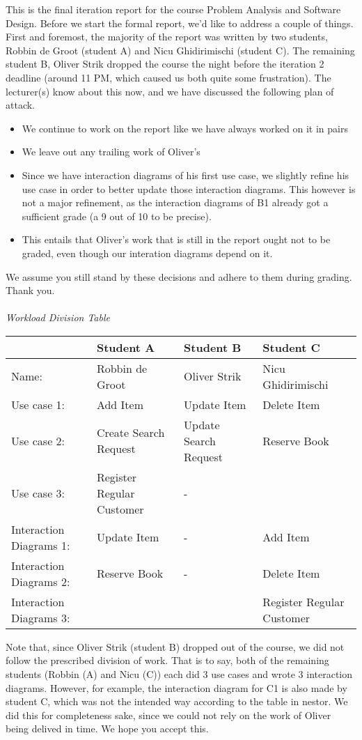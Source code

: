 This is the final iteration report for the course Problem Analysis and Software Design. Before we start the formal report, we'd like to address a couple of things.
First and foremost, the majority of the report was written by two students, Robbin de Groot (student A) and Nicu Ghidirimischi (student C). The remaining student B, Oliver Strik dropped the course the night before the iteration 2 deadline (around 11 PM, which caused us both quite some frustration). The lecturer(s) know about this now, and we have discussed the following plan of attack.
\begin{itemize}
	\item We continue to work on the report like we have always worked on it in pairs
	\item We leave out any trailing work of Oliver's
	\item Since we have interaction diagrams of his first use case, we slightly refine his use case in order to better update those interaction diagrams. This however is not a major refinement, as the interaction diagrams of B1 already got a sufficient grade (a 9 out of 10 to be precise).
	\item This entails that Oliver's work that is still in the report ought not to be graded, even though our interation diagrams depend on it.
\end{itemize}
We assume you still stand by these decisions and adhere to them during grading. Thank you.\\\\
\textsl{Workload Division Table}
\begin{center}\begin{tabular}{|l|l|l|l|}
\hline
 & Student A & Student B & Student C\\\hline
 Name: & Robbin de Groot & Oliver Strik & Nicu Ghidirimischi\\\hline
 Use case 1:& Add Item & Update Item & Delete Item\\\hline
 Use case 2:& Create Search Request & Update Search Request & Reserve Book\\\hline
 Use case 3:& Register Regular Customer & - & \\\hline
 Interaction Diagrams 1:& Update Item& - & Add Item\\\hline
 Interaction Diagrams 2:& Reserve Book & - & Delete Item\\\hline
 Interaction Diagrams 3:& & & Register Regular Customer \\\hline
 \end{tabular}\end{center}
 Note that, since Oliver Strik (student B) dropped out of the course, we did not follow the prescribed division of work. That is to say, both of the remaining students (Robbin (A) and Nicu (C)) each did 3 use cases and wrote 3 interaction diagrams. However, for example, the interaction diagram for C1 is also made by student C, which was not the intended way according to the table in nestor. We did this for completeness sake, since we could not rely on the work of Oliver being delived in time. We hope you accept this.